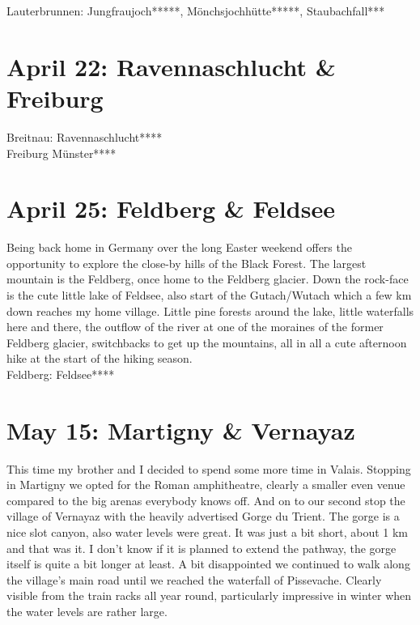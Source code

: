 Lauterbrunnen: Jungfraujoch*****, M\"onchsjochh\"utte*****, Staubachfall***

\section{April 22: Ravennaschlucht \& Freiburg}
\label{Freiburg2011}

Breitnau: Ravennaschlucht****\\
Freiburg M\"unster****

\section{April 25: Feldberg \& Feldsee}
\label{Feldsee}

Being back home in Germany over the long Easter weekend offers the opportunity to explore the close-by hills of the Black Forest. The largest mountain is the Feldberg, once home to the Feldberg glacier. Down the rock-face is the cute little lake of Feldsee, also start of the Gutach/Wutach which a few km down reaches my home village. Little pine forests around the lake, little waterfalls here and there, the outflow of the river at one of the moraines of the former Feldberg glacier, switchbacks to get up the mountains, all in all a cute afternoon hike at the start of the hiking season.\\

Feldberg: Feldsee****

\section{May 15: Martigny \& Vernayaz}
\label{Martigny2011}

This time my brother and I decided to spend some more time in Valais. Stopping in Martigny we opted for the Roman amphitheatre, clearly a smaller even venue compared to the big arenas everybody knows off. And on to our second stop the village of Vernayaz with the heavily advertised Gorge du Trient. The gorge is a nice slot canyon, also water levels were great. It was just a bit short, about 1 km and that was it. I don't know if it is planned to extend the pathway, the gorge itself is quite a bit longer at least. A bit disappointed we continued to walk along the village's main road until we reached the waterfall of Pissevache. Clearly visible from the train racks all year round, particularly impressive in winter when the water levels are rather large.\\

